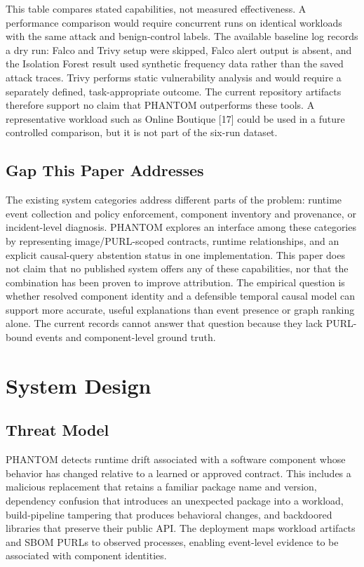 \documentclass[conference]{IEEEtran}
\begin{document}
This table compares stated capabilities, not measured effectiveness. A performance comparison would require concurrent runs on identical workloads with the same attack and benign-control labels. The available baseline log records a dry run: Falco and Trivy setup were skipped, Falco alert output is absent, and the Isolation Forest result used synthetic frequency data rather than the saved attack traces. Trivy performs static vulnerability analysis and would require a separately defined, task-appropriate outcome. The current repository artifacts therefore support no claim that PHANTOM outperforms these tools. A representative workload such as Online Boutique [17] could be used in a future controlled comparison, but it is not part of the six-run dataset.

\subsection{Gap This Paper Addresses}
The existing system categories address different parts of the problem: runtime event collection and policy enforcement, component inventory and provenance, or incident-level diagnosis. PHANTOM explores an interface among these categories by representing image/PURL-scoped contracts, runtime relationships, and an explicit causal-query abstention status in one implementation. This paper does not claim that no published system offers any of these capabilities, nor that the combination has been proven to improve attribution. The empirical question is whether resolved component identity and a defensible temporal causal model can support more accurate, useful explanations than event presence or graph ranking alone. The current records cannot answer that question because they lack PURL-bound events and component-level ground truth.

\section{System Design}
\subsection{Threat Model}
PHANTOM detects runtime drift associated with a software component whose behavior has changed relative to a learned or approved contract. This includes a malicious replacement that retains a familiar package name and version, dependency confusion that introduces an unexpected package into a workload, build-pipeline tampering that produces behavioral changes, and backdoored libraries that preserve their public API. The deployment maps workload artifacts and SBOM PURLs to observed processes, enabling event-level evidence to be associated with component identities.
\end{document}
